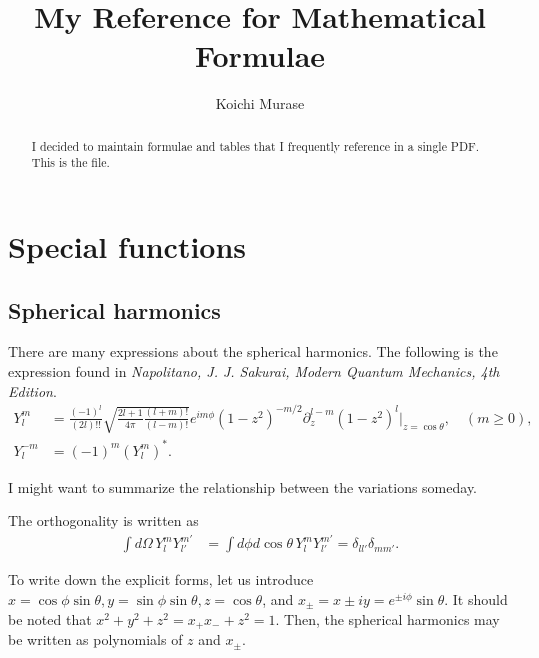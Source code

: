 \documentclass[amsmath,amssymb,prc,aps]{revtex4-2}
\begin{document}
\title{My Reference for Mathematical Formulae}
\author{Koichi Murase}
\begin{abstract}
I decided to maintain formulae and tables that I frequently reference in a
single PDF.  This is the file.
\end{abstract}
\maketitle

\section{Special functions}
\subsection{Spherical harmonics}

There are many expressions about the spherical harmonics. The following is the
expression found in \textit{Napolitano, J. J. Sakurai, Modern Quantum
Mechanics, 4th Edition}.
\begin{subequations}
\begin{align}
  Y_l^m &= \frac{(-1)^l}{(2l)!!} \sqrt{\frac{2l+1}{4\pi}\frac{(l+m)!}{(l-m)!}} e^{im\phi}
    (1-z^2)^{-m/2} \partial_z^{l-m} (1-z^2)^l|_{z=\cos\theta},
    \quad (m \ge 0), \\
  Y_l^{-m} &= (-1)^m (Y_l^m)^*.
\end{align}
\end{subequations}

I might want to summarize the relationship between the variations someday.

The orthogonality is written as
\begin{align}
  \int d\Omega\, Y_l^m Y_{l'}^{m'}
  &= \int d\phi d\!\cos\theta\, Y_l^m Y_{l'}^{m'} = \delta_{ll'}\delta_{mm'}.
\end{align}

To write down the explicit forms, let us introduce $x = \cos\phi\sin\theta,
y=\sin\phi\sin\theta, z=\cos\theta$, and $x_\pm = x\pm iy = e^{\pm
i\phi}\sin\theta$.  It should be noted that $x^2+y^2+z^2 = x_+ x_- + z^2 = 1$.
Then, the spherical harmonics may be written as polynomials of $z$ and $x_\pm$.
\end{document}
